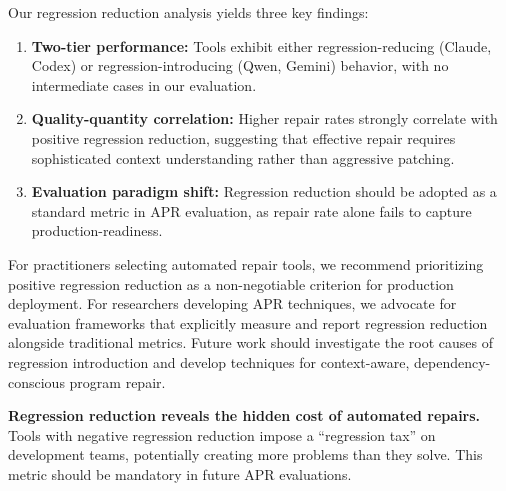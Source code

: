 Our regression reduction analysis yields three key findings:

\begin{enumerate}[leftmargin=*]
\item \textbf{Two-tier performance:} Tools exhibit either regression-reducing (Claude, Codex) or regression-introducing (Qwen, Gemini) behavior, with no intermediate cases in our evaluation.
\item \textbf{Quality-quantity correlation:} Higher repair rates strongly correlate with positive regression reduction, suggesting that effective repair requires sophisticated context understanding rather than aggressive patching.
\item \textbf{Evaluation paradigm shift:} Regression reduction should be adopted as a standard metric in APR evaluation, as repair rate alone fails to capture production-readiness.
\end{enumerate}

For practitioners selecting automated repair tools, we recommend prioritizing positive regression reduction as a non-negotiable criterion for production deployment. For researchers developing APR techniques, we advocate for evaluation frameworks that explicitly measure and report regression reduction alongside traditional metrics. Future work should investigate the root causes of regression introduction and develop techniques for context-aware, dependency-conscious program repair.

\begin{tcolorbox}[colback=gray!10, colframe=black!50, title=Key Takeaway]
\textbf{Regression reduction reveals the hidden cost of automated repairs.} Tools with negative regression reduction impose a ``regression tax'' on development teams, potentially creating more problems than they solve. This metric should be mandatory in future APR evaluations.
\end{tcolorbox}


